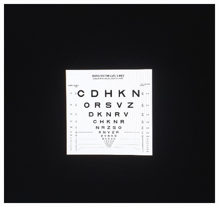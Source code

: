 \begin{multicols}{2}
\begin{figure}[H]
		\includegraphics[width= 1\linewidth]{13a}
		

\end{figure}
\end{multicols}
